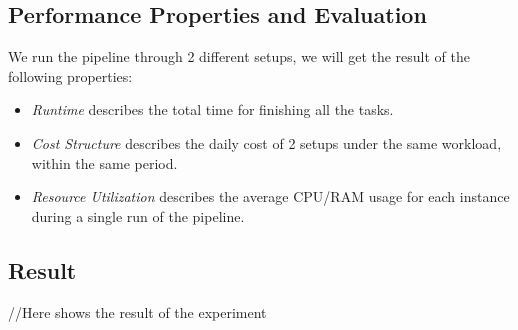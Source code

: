 \subsection{Performance Properties and Evaluation}
We run the pipeline through 2 different setups, we will get the result of the following properties:
\begin{itemize}
    \item \textit{Runtime} describes the total time for finishing all the tasks.
    \item \textit{Cost Structure} describes the daily cost of 2 setups under the same workload, within the same period.
    \item \textit{Resource Utilization} describes the average CPU/RAM usage for each instance during a single run of the pipeline.
\end{itemize}
\subsection{Result}
//Here shows the result of the experiment
